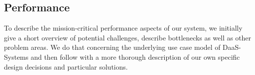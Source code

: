 \documentclass[runningheads]{llncs}
\begin{document}
\subsection{Performance}
%
%

To describe the mission-critical performance aspects of our system,
we initially give a short overview of potential challenges,
describe bottlenecks as well as other problem areas.
We do that concerning the underlying use case model of DaaS-Systems
and then follow with a more thorough description
of our own specific design decisions and particular solutions.
\end{document}
